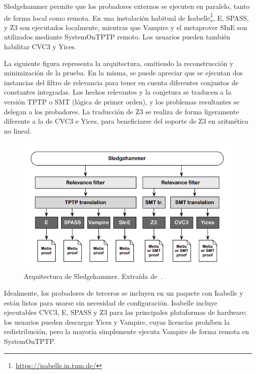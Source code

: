 \documentclass[12pt]{book}
\begin{document}
Sledgehammer permite que los probadores externos se ejecuten en paralelo, tanto de forma local como remota. En una instalación habitual de Isabelle\footnote{\href{https://isabelle.in.tum.de/}{https://isabelle.in.tum.de/}}, E, SPASS, y Z3 son ejecutados localmente, mientras que Vampire y el metaprover SInE son utilizados mediante SystemOnTPTP remoto. Los usuarios pueden también habilitar CVC3 y Yices.

La siguiente figura representa la arquitectura, omitiendo la reconstrucción y minimización de la prueba. En la misma, se puede apreciar que se ejecutan dos instancias del filtro de relevancia para tener en cuenta diferentes conjuntos de constantes integradas. Los hechos relevantes y la conjetura se traducen a la versión TPTP o SMT (lógica de primer orden), y los problemas resultantes se delegan a los probadores. La traducción de Z3 se realiza de forma ligeramente diferente a la de CVC3 e Yices, para beneficiarse del soporte de Z3 en aritmética no lineal.

\begin{figure}[H]
	\centering
	\includegraphics[width=\textwidth]{Sledgehammer_arquitecture.png}
	\caption{Arquitectura de Sledgehammer. Extraída de~\cite{proof_and_disproof}.}\label{fig:Sledgehammer_arquitecture.}
\end{figure}

Idealmente, los probadores de terceros se incluyen en un paquete con Isabelle y están listos para usarse sin necesidad de configuración. Isabelle incluye ejecutables CVC3, E, SPASS y Z3 para las principales plataformas de hardware; los usuarios pueden descargar Yices y Vampire, cuyas licencias prohíben la redistribución, pero la mayoría simplemente ejecuta Vampire de forma remota en SystemOnTPTP.\@
\end{document}
